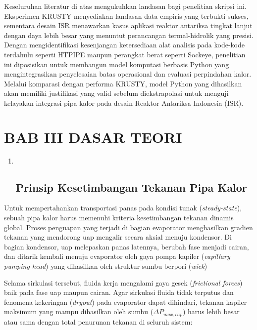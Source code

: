 \documentclass[
]{article}
\begin{document}
Keseluruhan literatur di atas mengukuhkan landasan bagi penelitian
skripsi ini. Eksperimen KRUSTY menyediakan landasan data empiris yang
terbukti sukses, sementara desain ISR menawarkan kasus aplikasi reaktor
antariksa tingkat lanjut dengan daya lebih besar yang menuntut
perancangan termal-hidrolik yang presisi. Dengan mengidentifikasi
kesenjangan ketersediaan alat analisis pada kode-kode terdahulu seperti
HTPIPE maupun perangkat berat seperti Sockeye, penelitian ini
diposisikan untuk membangun model komputasi berbasis Python yang
mengintegrasikan penyelesaian batas operasional dan evaluasi perpindahan
kalor. Melalui komparasi dengan performa KRUSTY, model Python yang
dihasilkan akan memiliki justifikasi yang valid sebelum diekstrapolasi
untuk menguji kelayakan integrasi pipa kalor pada desain Reaktor
Antariksa Indonesia (ISR).

\section{\texorpdfstring{\textbf{BAB III} \textbf{DASAR
TEORI}}{BAB III DASAR TEORI}}\label{bab-iii-dasar-teori}

\begin{enumerate}
\def\labelenumi{\arabic{enumi}.}
\item ~
  \subsection{\texorpdfstring{\textbf{Prinsip Kesetimbangan Tekanan Pipa
  Kalor}}{Prinsip Kesetimbangan Tekanan Pipa Kalor}}\label{prinsip-kesetimbangan-tekanan-pipa-kalor}
\end{enumerate}

Untuk mempertahankan transportasi panas pada kondisi tunak
(\emph{steady-state}), sebuah pipa kalor harus memenuhi kriteria
kesetimbangan tekanan dinamis global. Proses penguapan yang terjadi di
bagian evaporator menghasilkan gradien tekanan yang mendorong uap
mengalir secara aksial menuju kondensor. Di bagian kondensor, uap
melepaskan panas latennya, berubah fase menjadi cairan, dan ditarik
kembali menuju evaporator oleh gaya pompa kapiler (\emph{capillary
pumping head}) yang dihasilkan oleh struktur sumbu berpori (\emph{wick})

Selama sirkulasi tersebut, fluida kerja mengalami gaya gesek
(\emph{frictional forces}) baik pada fase uap maupun cairan. Agar
sirkulasi fluida tidak terputus dan fenomena kekeringan (\emph{dryout})
pada evaporator dapat dihindari, tekanan kapiler maksimum yang mampu
dihasilkan oleh sumbu (\(\Delta {P}_{max,cap}\)) harus lebih besar atau
sama dengan total penurunan tekanan di seluruh sistem:
\end{document}
